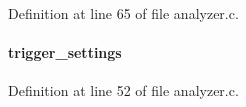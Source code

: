 Definition at line 65 of file analyzer.c.
\paragraph[{trigger\_\-settings}]{ {\bf trigger\_\-settings}}\hfill\label{analyzer_8c_a0bedba90e4b62eddbca641fac7402d4d}


Definition at line 52 of file analyzer.c.